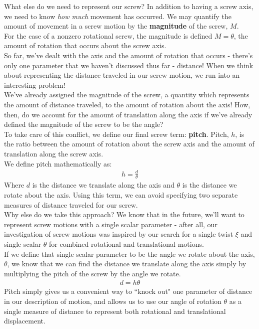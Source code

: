 \documentclass[oneside]{book}
\begin{document}
What else do we need to represent our screw? In addition to having a screw axis, we need to know \textit{how much} movement has occurred. We may quantify the amount of movement in a screw motion by the \textbf{magnitude} of the screw, $M$.\\
For the case of a nonzero rotational screw, the magnitude is defined $M = \theta$, the amount of rotation that occurs about the screw axis.\\
So far, we've dealt with the axis and the amount of rotation that occurs - there's only one parameter that we haven't discussed thus far - distance! When we think about representing the distance traveled in our screw motion, we run into an interesting problem!\\
We've already assigned the magnitude of the screw, a quantity which represents the amount of distance traveled, to the amount of rotation about the axis! How, then, do we account for the amount of translation along the axis if we've already defined the magnitude of the screw to be the angle?\\
To take care of this conflict, we define our final screw term: \textbf{pitch}. Pitch, $h$, is the ratio between the amount of rotation about the screw axis and the amount of translation along the screw axis.\\
We define pitch mathematically as:
\begin{align}
    h = \frac{d}{\theta}
\end{align}
Where $d$ is the distance we translate along the axis and $\theta$ is the distance we rotate about the axis. Using this term, we can avoid specifying two separate measures of distance traveled for our screw.\\
Why else do we take this approach? We know that in the future, we'll want to represent screw motions with a single scalar parameter - after all, our investigation of screw motions was inspired by our search for a single twist $\xi$ and single scalar $\theta$ for combined rotational and translational motions.\\
If we define that single scalar parameter to be the angle we rotate about the axis, $\theta$, we know that we can find the distance we translate along the axis simply by multiplying the pitch of the screw by the angle we rotate.
\begin{align}
    d = h\theta
\end{align}
Pitch simply gives us a convenient way to ``knock out" one parameter of distance in our description of motion, and allows us to use our angle of rotation $\theta$ as a single measure of distance to represent both rotational and translational displacement.
\end{document}
